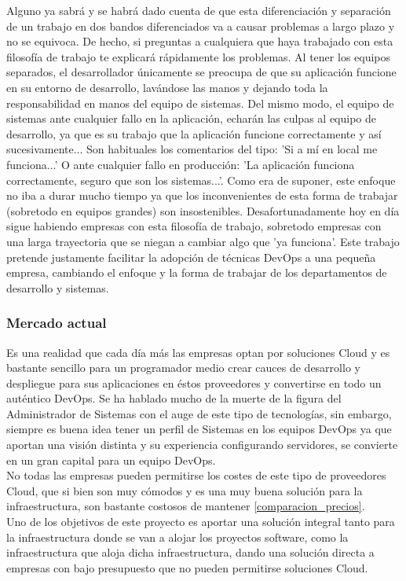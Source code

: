 \begin{text}
		Alguno ya sabrá y se habrá dado cuenta de que esta diferenciación y separación de un trabajo en dos bandos diferenciados va a causar problemas a largo plazo y no se equivoca. De hecho, si preguntas a cualquiera que haya trabajado con esta filosofía de trabajo te explicará rápidamente los problemas. Al tener los equipos separados, el desarrollador únicamente se preocupa de que su aplicación funcione en su entorno de desarrollo, lavándose las manos y dejando toda la responsabilidad en manos del equipo de sistemas. Del mismo modo, el equipo de sistemas ante cualquier fallo en la aplicación, echarán las culpas al equipo de desarrollo, ya que es su trabajo que la aplicación funcione correctamente y así sucesivamente... Son habituales los comentarios del tipo: 'Si a mí en local me funciona...' O ante cualquier fallo en producción: 'La aplicación funciona correctamente, seguro que son los sistemas...'. Como era de suponer, este enfoque no iba a durar mucho tiempo ya que los inconvenientes de esta forma de trabajar (sobretodo en equipos grandes) son insostenibles. Desafortunadamente hoy en día sigue habiendo empresas con esta filosofía de trabajo, sobretodo empresas con una larga trayectoria que se niegan a cambiar algo que 'ya funciona'. Este trabajo pretende justamente facilitar la adopción de técnicas DevOps a una pequeña empresa, cambiando el enfoque y la forma de trabajar de los departamentos de desarrollo y sistemas.
	\end{text}
	
	\subsubsection{Mercado actual}
		\begin{text}
			Es una realidad que cada día más las empresas optan por soluciones Cloud y es bastante sencillo para un programador medio crear cauces de desarrollo y despliegue para sus aplicaciones en éstos proveedores y convertirse en todo un auténtico DevOps. Se ha hablado mucho de la muerte de la figura del Administrador de Sistemas con el auge de este tipo de tecnologías, sin embargo, siempre es buena idea tener un perfil de Sistemas en los equipos DevOps ya que aportan una visión distinta y su experiencia configurando servidores, se convierte en un gran capital para un equipo DevOps. \\ 
			No todas las empresas pueden permitirse los costes de este tipo de proveedores Cloud, que si bien son muy cómodos y es una muy buena solución para la infraestructura, son bastante costosos de mantener \ref{comparacion_precios}. \\
			Uno de los objetivos de este proyecto es aportar una solución integral tanto para la infraestructura donde se van a alojar los proyectos software, como la infraestructura que aloja dicha infraestructura, dando una solución directa a empresas con bajo presupuesto que no pueden permitirse soluciones Cloud. \\
		\end{text}
	
